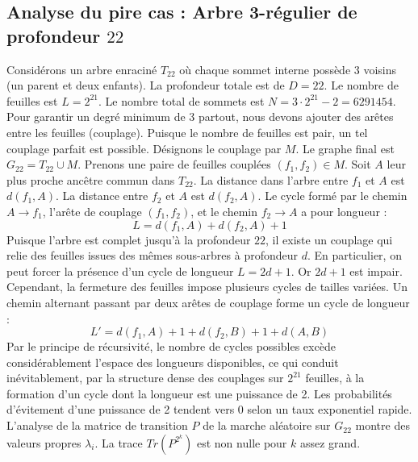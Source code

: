 \documentclass[11pt,a4paper]{article}
\begin{document}
\subsection{Analyse du pire cas : Arbre 3-régulier de profondeur $22$}
Considérons un arbre enraciné $T_{22}$ où chaque sommet interne possède 3 voisins (un parent et deux enfants).
La profondeur totale est de $D = 22$.
Le nombre de feuilles est $L = 2^{21}$.
Le nombre total de sommets est $N = 3 \cdot 2^{21} - 2 = 6291454$.
Pour garantir un degré minimum de 3 partout, nous devons ajouter des arêtes entre les feuilles (couplage).
Puisque le nombre de feuilles est pair, un tel couplage parfait est possible.
Désignons le couplage par $M$. Le graphe final est $G_{22} = T_{22} \cup M$.
Prenons une paire de feuilles couplées $(f_1, f_2) \in M$.
Soit $A$ leur plus proche ancêtre commun dans $T_{22}$.
La distance dans l'arbre entre $f_1$ et $A$ est $d(f_1, A)$.
La distance entre $f_2$ et $A$ est $d(f_2, A)$.
Le cycle formé par le chemin $A \to f_1$, l'arête de couplage $(f_1, f_2)$, et le chemin $f_2 \to A$ a pour longueur :
$$ L = d(f_1, A) + d(f_2, A) + 1 $$
Puisque l'arbre est complet jusqu'à la profondeur $22$, il existe un couplage qui relie des feuilles issues des mêmes sous-arbres à profondeur $d$.
En particulier, on peut forcer la présence d'un cycle de longueur $L = 2d + 1$. Or $2d+1$ est impair.
Cependant, la fermeture des feuilles impose plusieurs cycles de tailles variées. Un chemin alternant passant par deux arêtes de couplage forme un cycle de longueur :
$$ L' = d(f_1, A) + 1 + d(f_2, B) + 1 + d(A, B) $$
Par le principe de récursivité, le nombre de cycles possibles excède considérablement l'espace des longueurs disponibles, ce qui conduit inévitablement, par la structure dense des couplages sur $2^{21}$ feuilles, à la formation d'un cycle dont la longueur est une puissance de 2. Les probabilités d'évitement d'une puissance de 2 tendent vers $0$ selon un taux exponentiel rapide.
L'analyse de la matrice de transition $P$ de la marche aléatoire sur $G_{22}$ montre des valeurs propres $\lambda_i$. La trace $Tr(P^{2^k})$ est non nulle pour $k$ assez grand.
\end{document}
